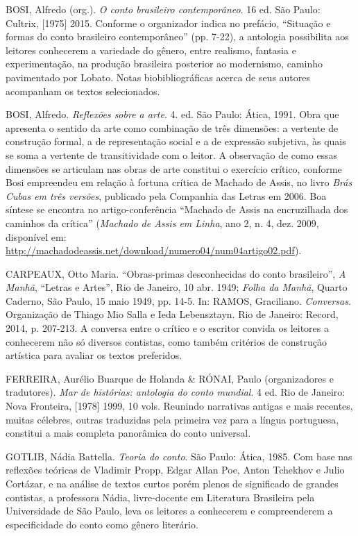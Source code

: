 \documentclass[12pt]{extarticle}
\begin{document}
BOSI, Alfredo (org.). \emph{O conto brasileiro contemporâneo}. 16 ed.
São Paulo: Cultrix, {[}1975{]} 2015. Conforme o organizador indica no
prefácio, ``Situação e formas do conto brasileiro contemporâneo'' (pp.
7-22), a antologia possibilita aos leitores conhecerem a variedade do
gênero, entre realismo, fantasia e experimentação, na produção
brasileira posterior ao modernismo, caminho pavimentado por Lobato.
Notas biobibliográficas acerca de seus autores acompanham os textos
selecionados.

BOSI, Alfredo. \emph{Reflexões sobre a arte}. 4. ed. São Paulo: Ática,
1991. Obra que apresenta o sentido da arte como combinação de três
dimensões: a vertente de construção formal, a de representação social e
a de expressão subjetiva, às quais se soma a vertente de transitividade
com o leitor. A observação de como essas dimensões se articulam nas
obras de arte constitui o exercício crítico, conforme Bosi empreendeu em
relação à fortuna crítica de Machado de Assis, no livro \emph{Brás Cubas
em três versões}, publicado pela Companhia das Letras em 2006. Boa
síntese se encontra no artigo-conferência ``Machado de Assis na
encruzilhada dos caminhos da crítica'' (\emph{Machado de Assis em
Linha}, ano 2, n. 4, dez. 2009, disponível em:
\url{http://machadodeassis.net/download/numero04/num04artigo02.pdf}).

CARPEAUX, Otto Maria. ``Obras-primas desconhecidas do conto
brasileiro'', \emph{A Manhã}, ``Letras e Artes'', Rio de Janeiro, 10
abr. 1949; \emph{Folha da Manhã}, Quarto Caderno, São Paulo, 15 maio
1949, pp. 14-5. In: RAMOS, Graciliano. \emph{Conversas}. Organização de
Thiago Mio Salla e Ieda Lebensztayn. Rio de Janeiro: Record, 2014, p.
207-213. A conversa entre o crítico e o escritor convida os leitores a
conhecerem não só diversos contistas, como também critérios de
construção artística para avaliar os textos preferidos.

FERREIRA, Aurélio Buarque de Holanda \& RÓNAI, Paulo (organizadores e
tradutores). \emph{Mar de histórias: antologia do conto mundial}. 4 ed.
Rio de Janeiro: Nova Fronteira, {[}1978{]} 1999, 10 vols. Reunindo
narrativas antigas e mais recentes, muitas célebres, outras traduzidas
pela primeira vez para a língua portuguesa, constitui a mais completa
panorâmica do conto universal.

GOTLIB, Nádia Battella. \emph{Teoria do conto}. São Paulo: Ática, 1985.
Com base nas reflexões teóricas de Vladimir Propp, Edgar Allan Poe,
Anton Tchekhov e Julio Cortázar, e na análise de textos curtos porém
plenos de significado de grandes contistas, a professora Nádia,
livre-docente em Literatura Brasileira pela Universidade de São Paulo,
leva os leitores a conhecerem e compreenderem a especificidade do conto
como gênero literário.
\end{document}
